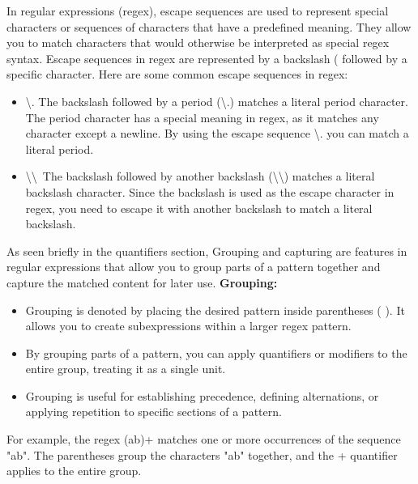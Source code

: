 \documentclass{report}
\begin{document}
    \pagebreak
    \bigbreak
    \noindent


    \bigbreak \noindent 
    In regular expressions (regex), escape sequences are used to represent special characters or sequences of characters that have a predefined meaning. They allow you to match characters that would otherwise be interpreted as special regex syntax. Escape sequences in regex are represented by a backslash (\) followed by a specific character. 
    \bigbreak \noindent 
    Here are some common escape sequences in regex:
    \begin{itemize}
        \item \textbackslash . The backslash followed by a period (\textbackslash .) matches a literal period character. The period character has a special meaning in regex, as it matches any character except a newline. By using the escape sequence \textbackslash . you can match a literal period.
        \item \textbackslash \textbackslash \  The backslash followed by another backslash (\textbackslash \textbackslash) matches a literal backslash character. Since the backslash is used as the escape character in regex, you need to escape it with another backslash to match a literal backslash.
    \end{itemize}
    \pagebreak
    \bigbreak
    \noindent

    \bigbreak \noindent 
    As seen briefly in the quantifiers section, Grouping and capturing are features in regular expressions that allow you to group parts of a pattern together and capture the matched content for later use.
    \bigbreak \noindent 
    \textbf{Grouping:}
    \begin{itemize}
        \item Grouping is denoted by placing the desired pattern inside parentheses ( ). It allows you to create subexpressions within a larger regex pattern.
        \item By grouping parts of a pattern, you can apply quantifiers or modifiers to the entire group, treating it as a single unit.
        \item Grouping is useful for establishing precedence, defining alternations, or applying repetition to specific sections of a pattern.
    \end{itemize}
    \bigbreak \noindent 
    For example, the regex (ab)+ matches one or more occurrences of the sequence "ab". The parentheses group the characters "ab" together, and the + quantifier applies to the entire group.
\end{document}
